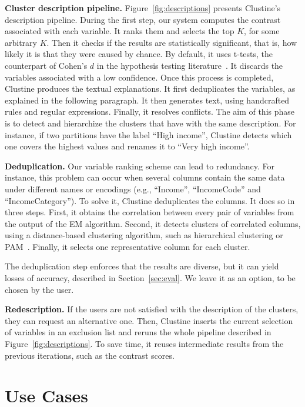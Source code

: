 \textbf{Cluster description pipeline.} Figure~\ref{fig:descriptions} presents
Clustine's description pipeline. During the first step, our system computes the
contrast associated with each variable. It ranks them and selects the
top $K$, for some arbitrary $K$. Then it checks if the results are
statistically significant, that is, how likely it is that they were caused by
chance. By default, it uses t-tests, the counterpart of Cohen's $d$ in the
hypothesis testing literature~\cite{cohen1977statistical}. It discards the
variables associated with a low confidence. Once this process is completed,
Clustine produces the textual explanations. It first deduplicates the
variables, as explained in the following paragraph. It then generates text, using handcrafted
rules and regular expressions.  Finally, it resolves conflicts. The aim
of this phase is to detect and hierarchize the clusters that have with the
same description. For instance, if two partitions have the label ``High
income'', Clustine detects  which one covers the highest values and renames it
to ``Very high income''.

\textbf{Deduplication.} Our variable ranking scheme can lead to redundancy.
For instance, this problem can occur when several columns contain the same data
under different names or encodings (e.g., ``Income'', ``IncomeCode'' and
``IncomeCategory''). To solve it, Clustine deduplicates the columns.  It does
so in three steps. First, it obtains the correlation between every pair of
variables from the output of the EM algorithm. Second, it detects clusters of
correlated columns, using a distance-based clustering algorithm, such as
hierarchical clustering or PAM~\cite{bishop2001bishop}.  Finally, it selects
one representative column for each cluster. 

The deduplication step enforces that the results are diverse, but it can yield
losses of accuracy, described in Section~\ref{sec:eval}.  We leave it as an
option, to be chosen by the user.

\textbf{Redescription.} If the users are not satisfied with the description of
the clusters, they can request an alternative one. Then, Clustine inserts the
current selection of variables in an exclusion list and reruns the whole
pipeline described in Figure~\ref{fig:descriptions}. To save time, it reuses
intermediate results from the previous iterations, such as the contrast
scores.

\section{Use Cases}
\label{sec:demo}

